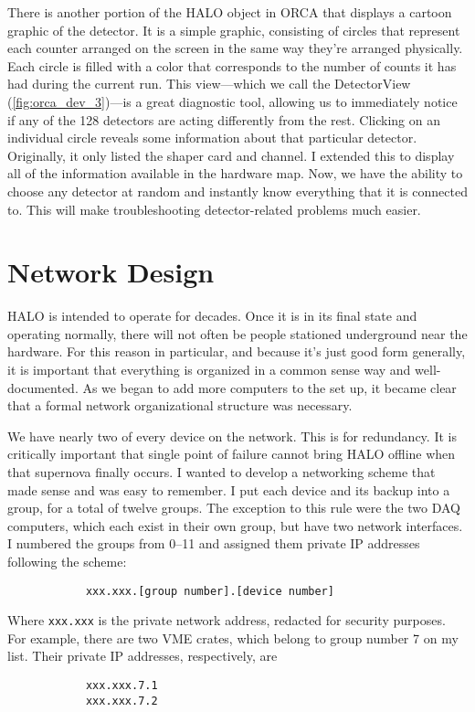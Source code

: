 		There is another portion of the HALO object in ORCA that displays a cartoon graphic of the detector. It is a simple graphic, consisting of circles that represent each \he counter arranged on the screen in the same way they're arranged physically. Each circle is filled with a color that corresponds to the number of counts it has had during the current run. This view---which we call the DetectorView (\FIG \ref{fig:orca_dev_3})---is a great diagnostic tool, allowing us to immediately notice if any of the 128 detectors are acting differently from the rest. Clicking on an individual circle reveals some information about that particular detector. Originally, it only listed the shaper card and channel. I extended this to display all of the information available in the hardware map. Now, we have the ability to choose any \he detector at random and instantly know everything that it is connected to. This will make troubleshooting detector-related problems much easier.


	\section{Network Design}
		HALO is intended to operate for decades. Once it is in its final state and operating normally, there will not often be people stationed underground near the hardware. For this reason in particular, and because it's just good form generally, it is important that everything is organized in a common sense way and well-documented. As we began to add more computers to the set up, it became clear that a formal network organizational structure was necessary. 

		We have nearly two of every device on the network. This is for redundancy. It is critically important that single point of failure cannot bring HALO offline when that supernova finally occurs. I wanted to develop a networking scheme that made sense and was easy to remember. I put each device and its backup into a group, for a total of twelve groups. The exception to this rule were the two DAQ computers, which each exist in their own group, but have two network interfaces. I numbered the groups from 0--11 and assigned them private IP addresses following the scheme:
		\begin{verbatim}
		    xxx.xxx.[group number].[device number]
		\end{verbatim}
		Where \verb$xxx.xxx$ is the private network address, redacted for security purposes. For example, there are two VME crates, which belong to group number 7 on my list. Their private IP addresses, respectively, are
		\begin{verbatim}
		    xxx.xxx.7.1
		    xxx.xxx.7.2
		\end{verbatim}


